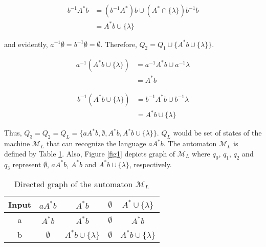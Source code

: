 \begin{equation}
\begin{aligned}
b^{-1}A^*b &= (b^{-1}A^*)b \cup (A^* \cap \{\lambda\})b^{-1}b\\
&= A^*b \cup \{\lambda\}
\end{aligned}
\end{equation}

and evidently, $a^{-1}\emptyset = b^{-1}\emptyset = \emptyset$.
Therefore, $Q_2 = Q_1 \cup \{A^*b \cup \{\lambda\}\}$.

\begin{equation}
\begin{aligned}
a^{-1}(A^*b\cup\{\lambda \}) &= a^{-1}A^*b \cup a^{-1}\lambda\\
&= A^*b
\end{aligned}
\end{equation}

\begin{equation}
\begin{aligned}
b^{-1}(A^*b\cup\{\lambda \}) &= b^{-1}A^*b \cup b^{-1}\lambda\\
&= A^*b \cup \{\lambda \}
\end{aligned}
\end{equation}

Thus, $Q_3 = Q_2 = Q_L = \{aA^*b, \emptyset, A^*b, A^*b\cup\{\lambda \} \}$.
$Q_L$ would be set of states of the machine $\mathcal{M}_L$ that can recognize the language $aA^*b$.
The automaton $\mathcal{M}_L$ is defined by Table \ref{tab1}.
Also, Figure \ref{fig1} depicts graph of $\mathcal{M}_L$ where $q_0$, $q_1$, $q_2$ and $q_3$ represent $\emptyset$, $aA^*b$, $A^*b$ and $A^*b\cup\{\lambda \}$, respectively.

\begin{table}\centering
	\begin{tabular}[H!]{|c||c|c|c|c|}
		\hline
		Input & $aA^*b$ & $A^*b$ & $\emptyset$ & $A^*\cup \{\lambda \}$\\
		\hline
		a & $A^*b$ & $A^*b$& $\emptyset$& $A^*b$\\
		b & $\emptyset$ & $A^*b\cup \{\lambda \}$& $\emptyset$ & $A^*b \cup \{\lambda \}$\\
		\hline
	\end{tabular}
	\caption{Directed graph of the automaton $\mathcal{M}_L$}\label{tab1}
\end{table}

